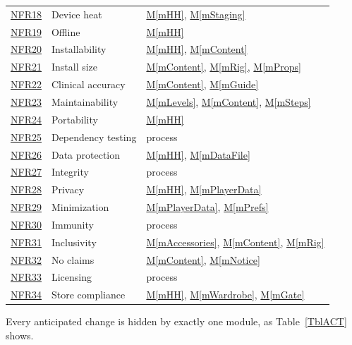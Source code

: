 \documentclass[12pt, titlepage]{article}
\newcommand{\mref}[1]{\hyperref[#1]{M\ref*{#1}}}
\newcommand{\srsurl}{https://team-hindsight.github.io/ophthamology-game/SRS/SRS.pdf}
\newcommand{\srsnfrref}[2]{\href{\srsurl\#nameddest=#1}{NFR#2}}
\begin{document}
\begin{longtable}{p{} p{} p{}}
\srsnfrref{NFR_DeviceHeat}{18} & Device heat & \mref{mHH}, \mref{mStaging}\\
\srsnfrref{NFR_Offline}{19} & Offline & \mref{mHH}\\
\srsnfrref{NFR_Installability}{20} & Installability & \mref{mHH}, \mref{mContent}\\
\srsnfrref{NFR_InstallSize}{21} & Install size & \mref{mContent}, \mref{mRig}, \mref{mProps}\\
\srsnfrref{NFR_ClinicalAccuracy}{22} & Clinical accuracy & \mref{mContent}, \mref{mGuide}\\
\srsnfrref{NFR_Maintainability}{23} & Maintainability & \mref{mLevels}, \mref{mContent}, \mref{mSteps}\\
\srsnfrref{NFR_Portability}{24} & Portability & \mref{mHH}\\
\srsnfrref{NFR_DependencyTesting}{25} & Dependency testing & process\\
\srsnfrref{NFR_DataProtection}{26} & Data protection & \mref{mHH}, \mref{mDataFile}\\
\srsnfrref{NFR_Integrity}{27} & Integrity & process\\
\srsnfrref{NFR_Privacy}{28} & Privacy & \mref{mHH}, \mref{mPlayerData}\\
\srsnfrref{NFR_Minimization}{29} & Minimization & \mref{mPlayerData}, \mref{mPrefs}\\
\srsnfrref{NFR_Immunity}{30} & Immunity & process\\
\srsnfrref{NFR_Inclusivity}{31} & Inclusivity & \mref{mAccessories}, \mref{mContent}, \mref{mRig}\\
\srsnfrref{NFR_NoClaims}{32} & No claims & \mref{mContent}, \mref{mNotice}\\
\srsnfrref{NFR_Licensing}{33} & Licensing & process\\
\srsnfrref{NFR_StoreCompliance}{34} & Store compliance & \mref{mHH}, \mref{mWardrobe}, \mref{mGate}\\
\bottomrule
\end{longtable}

Every anticipated change is hidden by exactly one module, as
Table~\ref{TblACT} shows.
\end{document}
